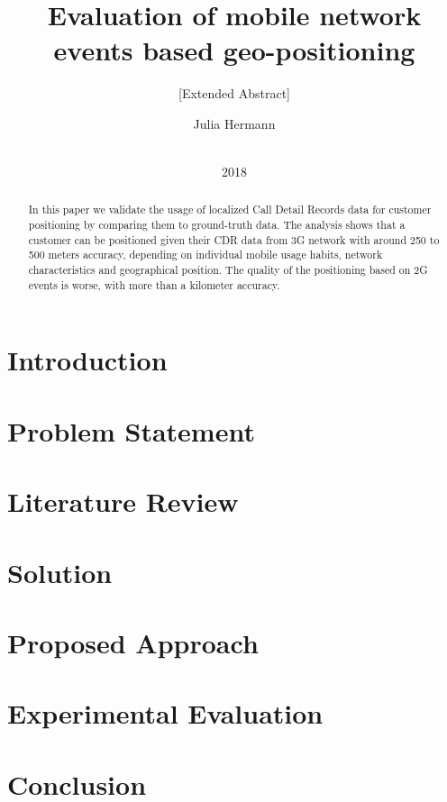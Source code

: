\documentclass{sig-alternate-05-2015}
\begin{document}
\title{Evaluation of mobile network events based geo-positioning}
\subtitle{[Extended Abstract]}

\author{
\alignauthor
Julia Hermann\\
       \\
}

\maketitle
\date{ 2018}
\begin{abstract}
In this paper we validate the usage of localized Call Detail Records data for customer positioning by comparing them to ground-truth data. The analysis shows that a customer can be positioned given their CDR data from 3G network with around 250 to 500 meters accuracy, depending on individual mobile usage habits, network characteristics and geographical position. The quality of the positioning based on 2G events is worse, with more than a kilometer accuracy.

\end{abstract}
\section{Introduction}
\section{Problem Statement}
\section{Literature Review}
\section{Solution}
\section{Proposed Approach}
\section{Experimental Evaluation}
\section{Conclusion}



\end{document}
